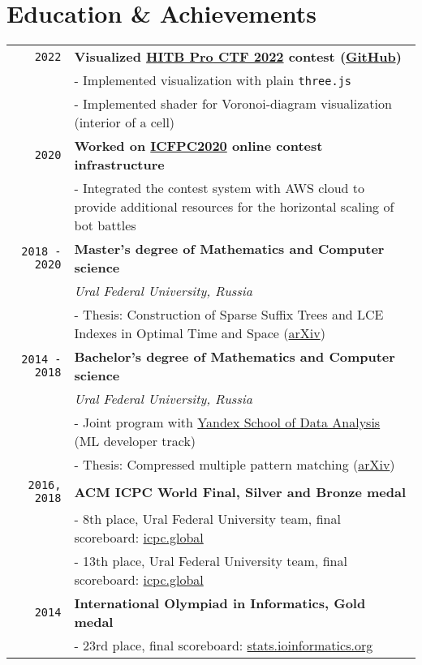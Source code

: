 \documentclass[10pt,a4paper]{article}
\begin{document}
\section{Education \& Achievements}
\vspace{1mm}
\begin{tabular}{r p{14cm}}
	\texttt{2022} & \textbf{Visualized \href{https://proctf.cyberweek.ae/}{HITB Pro CTF 2022} contest (\href{https://github.com/sivukhin/cell-visualization}{GitHub})}\\
	& \small{- Implemented visualization with plain \texttt{three.js}}\\
	& \small{- Implemented shader for Voronoi-diagram visualization (interior of a cell)}\\

	\texttt{2020} & \textbf{Worked on \href{https://icfpcontest2020.github.io}{ICFPC2020} online contest infrastructure}\\
	& \small{- Integrated the contest system with AWS cloud to provide additional resources for the horizontal scaling of bot battles}\\

    \texttt{2018 - 2020} & \textbf{Master's degree of Mathematics and Computer science} \\
    & \small\textit{Ural Federal University, Russia}\\
    & \small{- Thesis: Construction of Sparse Suffix Trees and LCE Indexes in Optimal Time and Space (\href{https://arxiv.org/abs/2105.03782}{arXiv})} \\

    \texttt{2014 - 2018} & \textbf{Bachelor's degree of Mathematics and Computer science} \\
    & \small\textit{Ural Federal University, Russia}\\
    & \small{- Joint program with \href{https://dataschool.yandex.com/}{Yandex School of Data Analysis}} (ML developer track) \\
    & \small{- Thesis: Compressed multiple pattern matching (\href{https://arxiv.org/abs/1811.01248}{arXiv})} \\

    \texttt{2016, 2018} & \textbf{ACM ICPC World Final, Silver and Bronze medal}\\
    & \small{- 8th place, Ural Federal University team, final scoreboard: \href{https://icpc.global/community/results-2016}{icpc.global}}\\
    & \small{- 13th place, Ural Federal University team, final scoreboard: \href{https://icpc.global/community/results-2018}{icpc.global}}\\

	\texttt{2014} & \textbf{International Olympiad in Informatics, Gold medal}\\
	& \small{- 23rd place, final scoreboard: \href{http://stats.ioinformatics.org/results/2014}{stats.ioinformatics.org}}
\end{tabular}
\end{document}
